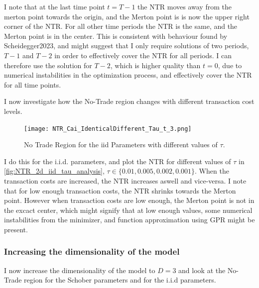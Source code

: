 \documentclass[11pt]{article}
\begin{document}
I note that at the last time point $t = T-1$ the \ac{NTR} moves away from the merton point towards the origin, and the Merton point is is
now the upper right corner of the \ac{NTR}. For all other time periods the \ac{NTR} is the same, and the Merton point is in the center.
This is consistent with behaviour found by \autocite{CaiJuddXu2013}{Scheidegger2023}, and might suggest that I only require solutions of two periods, $T-1$ and $T-2$ in order to
effectively cover the \ac{NTR} for all periods. I can therefore use the solution for $T-2$, which is higher quality than $t=0$, due to numerical instabilities in the optimization process,
and effectively cover the \ac{NTR} for all time points. 

I now investigate how the No-Trade region changes with different transaction cost levels.
\begin{figure}[!ht]
    \centering
    \texttt{[image: NTR\_Cai\_IdenticalDifferent\_Tau\_t\_3.png]}
    \caption{No Trade Region for the iid Parameters with different values of $\tau$.}
    \label{fig:NTR_2d_iid_tau_analysis}
\end{figure}
I do this for the i.i.d. parameters, and plot the \ac{NTR} for different values of $\tau$ in \autoref{fig:NTR_2d_iid_tau_analysis}, $\tau \in \{ 0.01, 0.005, 0.002, 0.001 \}$.
When the transaction costs are increased, the \ac{NTR} increases aswell and vice-versa. 
I note that for low enough transaction costs, the \ac{NTR} shrinks towards the Merton point.
However when transaction costs are low enough, the Merton point is not in the excact center, which might signify that at low enough values, some numerical instabilities from the
minimizer, and function approximation using \ac{GPR} might be present.

\subsubsection{Increasing the dimensionality of the model} \label{Subsubsection: IncreasingDimensionality}
I now increase the dimensionality of the model to $D = 3$ and look at the No-Trade region for the Schober parameters and for the i.i.d parameters.
\end{document}
